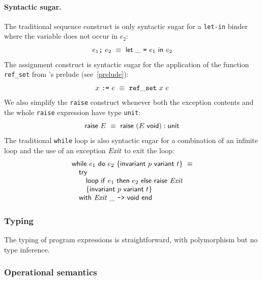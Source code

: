 \documentclass[a4paper,12pt]{report}
\begin{document}
\paragraph{Syntactic sugar.}
The traditional sequence construct is only syntactic sugar for a
\texttt{let-in} binder where the variable does not occur in $e_2$: 
\begin{displaymath}
e_1\texttt{;}~e_2 ~\equiv~ \mathsf{let}~\_~\texttt{=}~e_1~\mathsf{in}~e_2
\end{displaymath}
The assignment construct is syntactic sugar for the application of the
function \texttt{ref\_set} from \why's prelude (see~\ref{prelude}):
\begin{displaymath}
  x~\texttt{:=}~e ~\equiv~ \mathtt{ref\_set}~x~e
\end{displaymath}
We also simplify the \texttt{raise} construct whenever both the exception
contents and the whole \texttt{raise} expression have type \texttt{unit}:
\begin{displaymath}
  \mathsf{raise}~E ~\equiv~ \mathsf{raise}~({E}~{\mathsf{void}}):\mathsf{unit}
\end{displaymath}
The traditional \texttt{while} loop is also syntactic sugar for a
combination of an infinite loop and the use of an exception $\mathit{Exit}$ to
exit the loop:
\begin{displaymath}
  \begin{array}{ll}
    \mathsf{while}~e_1~\mathsf{do}~e_2~\{\mathsf{invariant}~p~\mathsf{variant}~t\} ~\equiv \\
    \quad \mathsf{try} \\
    \quad \quad \mathsf{loop} ~ \mathsf{if}~e_1~\mathsf{then}~e_2~\mathsf{else}~\mathsf{raise}~\mathit{Exit} \\
    \quad \quad \{\mathsf{invariant} ~ p ~ \mathsf{variant} ~ t\} \\
    \quad \mathsf{with} ~ \mathit{Exit}~\_ ~ \texttt{->} ~ \mathsf{void} ~ \mathsf{end}
  \end{array}
\end{displaymath}

\subsubsection{Typing}

The typing of program expressions is straightforward, with
polymorphism but no type inference.


\subsubsection{Operational semantics}
\end{document}

